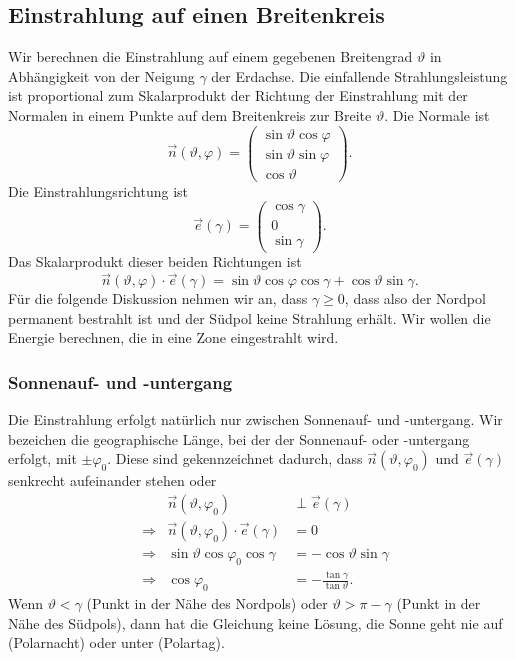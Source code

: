 %
%
%
\subsection{Einstrahlung auf einen Breitenkreis}
Wir berechnen die Einstrahlung auf einem gegebenen Breitengrad
$\vartheta$ in Abhängigkeit von der Neigung $\gamma$
der Erdachse.
Die einfallende Strahlungsleistung ist proportional zum Skalarprodukt
der Richtung der Einstrahlung mit der Normalen in einem Punkte
auf dem Breitenkreis zur Breite $\vartheta$.
Die Normale ist
\[
\vec n(\vartheta,\varphi)
=
\begin{pmatrix}
\sin\vartheta\cos\varphi\\
\sin\vartheta\sin\varphi\\
\cos\vartheta
\end{pmatrix}.
\]
Die Einstrahlungsrichtung ist
\[
\vec e(\gamma)
=
\begin{pmatrix}
\cos\gamma\\
0\\
\sin\gamma
\end{pmatrix}.
\]
Das Skalarprodukt dieser beiden Richtungen ist
\begin{equation}
\vec n(\vartheta,\varphi)\cdot\vec e(\gamma)
=
\sin\vartheta\cos\varphi\cos\gamma
+
\cos\vartheta\sin\gamma.
\label{skript:einstrahlung:skalarprodukt}
\end{equation}
Für die folgende Diskussion nehmen wir an, dass $\gamma \ge 0$,
dass also der Nordpol permanent bestrahlt ist und der Südpol keine
Strahlung erhält.
Wir wollen die Energie berechnen, die in eine Zone
eingestrahlt wird.

\subsubsection{Sonnenauf- und -untergang}
Die Einstrahlung erfolgt natürlich nur zwischen Sonnenauf- und
-untergang.
Wir bezeichen die geographische Länge, bei der der Sonnenauf- oder
-untergang erfolgt, mit $\pm\varphi_0$.
Diese sind gekennzeichnet dadurch, dass $\vec n(\vartheta,\varphi_0)$ und
$\vec e(\gamma)$ senkrecht aufeinander stehen oder
\begin{equation*}
\begin{aligned}
&&
\vec n(\vartheta,\varphi_0)&\perp \vec e(\gamma)
\\
&\Rightarrow&
\vec n(\vartheta,\varphi_0)\cdot \vec e(\gamma)&=0
\\
&\Rightarrow&
\sin\vartheta\cos\varphi_0\cos\gamma
&=
-
\cos\vartheta\sin\gamma
\\
&\Rightarrow&
\cos\varphi_0
&=
-\frac{\tan\gamma}{\tan\vartheta}.
\end{aligned}
\end{equation*}
Wenn $\vartheta < \gamma$ (Punkt in der Nähe des Nordpols) oder
$\vartheta > \pi - \gamma$ (Punkt in der Nähe des Südpols),
dann hat die Gleichung keine Lösung,
die Sonne geht nie auf (Polarnacht) oder unter (Polartag).

